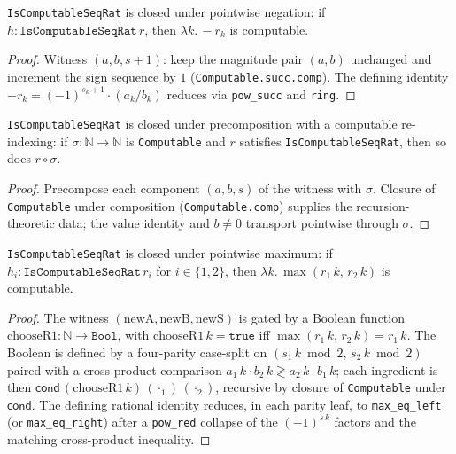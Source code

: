 \begin{lemma}
  \label{lem:l1_isComputableSeqRat_neg}
  \leanok
  \texttt{IsComputableSeqRat} is closed under pointwise negation: if $h : \texttt{IsComputableSeqRat}\,r$, then $\lambda k.\,-r_k$ is computable.
\end{lemma}
\begin{proof}\leanok
  Witness $(a, b, s+1)$: keep the magnitude pair $(a, b)$ unchanged and increment the sign sequence by $1$ (\texttt{Computable.succ.comp}). The defining identity $-r_k = (-1)^{s_k+1} \cdot (a_k / b_k)$ reduces via \texttt{pow\_succ} and \texttt{ring}.
\end{proof}

\begin{lemma}
  \label{lem:l1_isComputableSeqRat_comp}
  \leanok
  \texttt{IsComputableSeqRat} is closed under precomposition with a computable re-indexing: if $\sigma : \mathbb{N} \to \mathbb{N}$ is \texttt{Computable} and $r$ satisfies \texttt{IsComputableSeqRat}, then so does $r \circ \sigma$.
\end{lemma}
\begin{proof}\leanok
  Precompose each component $(a, b, s)$ of the witness with $\sigma$. Closure of \texttt{Computable} under composition (\texttt{Computable.comp}) supplies the recursion-theoretic data; the value identity and $b \ne 0$ transport pointwise through $\sigma$.
\end{proof}

\begin{lemma}
  \label{lem:l1_isComputableSeqRat_max}
  \leanok
  \texttt{IsComputableSeqRat} is closed under pointwise maximum: if $h_i : \texttt{IsComputableSeqRat}\,r_i$ for $i \in \{1,2\}$, then $\lambda k.\,\max(r_1\,k,\,r_2\,k)$ is computable.
\end{lemma}
\begin{proof}\leanok
  The witness $(\mathrm{newA}, \mathrm{newB}, \mathrm{newS})$ is gated by a Boolean function $\mathrm{chooseR1} : \mathbb{N} \to \mathtt{Bool}$, with $\mathrm{chooseR1}\,k = \mathtt{true}$ iff $\max(r_1\,k,\,r_2\,k) = r_1\,k$. The Boolean is defined by a four-parity case-split on $(s_1\,k \bmod 2,\, s_2\,k \bmod 2)$ paired with a cross-product comparison $a_1\,k \cdot b_2\,k \gtrless a_2\,k \cdot b_1\,k$; each ingredient is then $\mathsf{cond}\,(\mathrm{chooseR1}\,k)\,(\cdot_1)\,(\cdot_2)$, recursive by closure of \texttt{Computable} under $\mathsf{cond}$. The defining rational identity reduces, in each parity leaf, to \texttt{max\_eq\_left} (or \texttt{max\_eq\_right}) after a \texttt{pow\_red} collapse of the $(-1)^{s\,k}$ factors and the matching cross-product inequality.
\end{proof}

